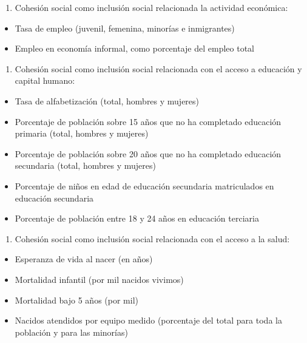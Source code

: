 \documentclass[
  12pt,
]{book}
\providecommand{\tightlist}{%
  \setlength{\itemsep}{0pt}\setlength{\parskip}{0pt}}
\begin{document}
\begin{enumerate}
\def\labelenumi{\arabic{enumi}.}
\setcounter{enumi}{1}
\tightlist
\item
  Cohesión social como inclusión social relacionada la actividad económica:
\end{enumerate}

\begin{itemize}
\tightlist
\item
  Tasa de empleo (juvenil, femenina, minorías e inmigrantes)
\item
  Empleo en economía informal, como porcentaje del empleo total
\end{itemize}

\begin{enumerate}
\def\labelenumi{\arabic{enumi}.}
\setcounter{enumi}{2}
\tightlist
\item
  Cohesión social como inclusión social relacionada con el acceso a educación y capital humano:
\end{enumerate}

\begin{itemize}
\tightlist
\item
  Tasa de alfabetización (total, hombres y mujeres)
\item
  Porcentaje de población sobre 15 años que no ha completado educación primaria (total, hombres y mujeres)
\item
  Porcentaje de población sobre 20 años que no ha completado educación secundaria (total, hombres y mujeres)
\item
  Porcentaje de niños en edad de educación secundaria matriculados en educación secundaria
\item
  Porcentaje de población entre 18 y 24 años en educación terciaria
\end{itemize}

\begin{enumerate}
\def\labelenumi{\arabic{enumi}.}
\setcounter{enumi}{3}
\tightlist
\item
  Cohesión social como inclusión social relacionada con el acceso a la salud:
\end{enumerate}

\begin{itemize}
\tightlist
\item
  Esperanza de vida al nacer (en años)
\item
  Mortalidad infantil (por mil nacidos vivimos)
\item
  Mortalidad bajo 5 años (por mil)
\item
  Nacidos atendidos por equipo medido (porcentaje del total para toda la población y para las minorías)
\end{itemize}
\end{document}
